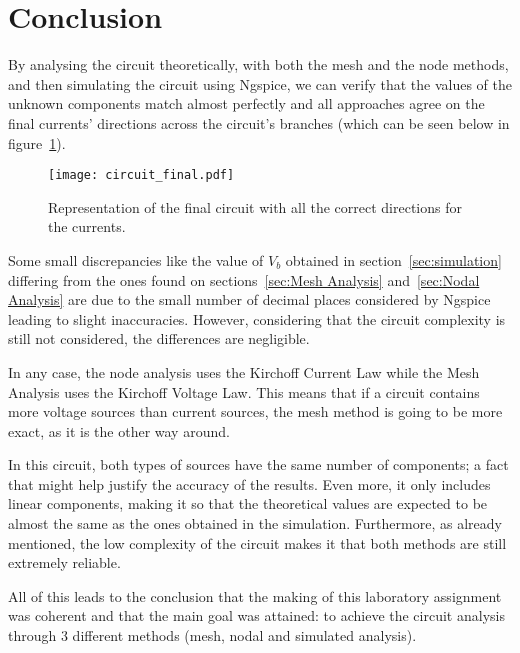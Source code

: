\newpage
\section{Conclusion}
\label{sec:conclusion}

By analysing the circuit theoretically, with both the mesh and the node methods, and then simulating the circuit using Ngspice, we can verify that the values of the unknown components match almost perfectly and all approaches agree on the final currents' directions across the circuit's branches (which can be seen below in figure~\ref{fig:circuit_final}).

\begin{figure}[!ht] \centering
\texttt{[image: circuit\_final.pdf]}
\caption{Representation of the final circuit with all the correct directions for the currents.}
\label{fig:circuit_final}
\end{figure}

Some small discrepancies like the value of $V_b$ obtained in section~\ref{sec:simulation} differing from the ones found on sections~\ref{sec:Mesh Analysis} and~\ref{sec:Nodal Analysis} are due to the small number of decimal places considered by Ngspice leading to slight inaccuracies. However, considering that the circuit complexity is still not considered, the differences are negligible.

In any case, the node analysis uses the Kirchoff Current Law while the Mesh Analysis uses the Kirchoff Voltage Law. This means that if a circuit contains more voltage sources than current sources, the mesh method is going to be more exact, as it is the other way around. 

In this circuit, both types of sources have the same number of components; a fact that might help justify the accuracy of the results. Even more, it only includes linear components, making it so that the theoretical values are expected to be almost the same as the ones obtained in the simulation. Furthermore, as already mentioned, the low complexity of the circuit makes it that both methods are still extremely reliable.

All of this leads to the conclusion that the making of this laboratory assignment was coherent and that the main goal was attained: to achieve the circuit analysis through 3 different methods (mesh, nodal and simulated analysis).

